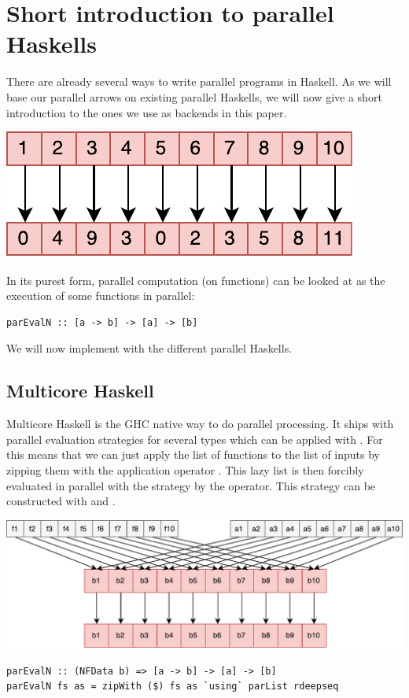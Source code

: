 \section{Short introduction to parallel Haskells}
There are already several ways to write parallel programs in Haskell. As we will base our parallel arrows on existing parallel Haskells, we will now give a short introduction to the ones we use as backends in this paper.
\begin{center}
	\includegraphics[scale=0.7]{images/parEvalN}
\end{center}
In its purest form, parallel computation (on functions) can be looked at as the execution of some functions  in parallel:
\begin{lstlisting}[frame=htrbl]
parEvalN :: [a -> b] -> [a] -> [b]
\end{lstlisting}
We will now implement  with the different parallel Haskells.

\subsection{Multicore Haskell}
Multicore Haskell \cite{multicore_hackage} is the GHC native way to do parallel processing. It ships with parallel evaluation strategies for several types which can be applied with . For  this means that we can just apply the list of functions \code{[a -> b]} to the list of inputs \code{[a]} by zipping them with the application operator \code{\$}. This lazy list \code{[b]} is then forcibly evaluated in parallel with the strategy  by the  operator. This strategy can be constructed with  and .
\begin{center}
	\includegraphics[scale=0.5]{images/parEvalNMulticore}
\end{center}
\begin{lstlisting}[frame=htrbl]
parEvalN :: (NFData b) => [a -> b] -> [a] -> [b]
parEvalN fs as = zipWith ($) fs as `using` parList rdeepseq
\end{lstlisting}

